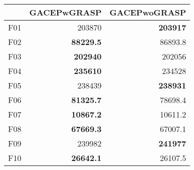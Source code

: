 \begin{table}[]
\begin{tabular}{l|r|r|}
\cline{2-3}
                                                   & \multicolumn{1}{l|}{\cellcolor[HTML]{FFFFC7}GACEPwGRASP} & \multicolumn{1}{l|}{\cellcolor[HTML]{FFFFC7}GACEPwoGRASP} \\ \hline
\multicolumn{1}{|l|}{\cellcolor[HTML]{FCE6AB}F01}  & 203870                                                   & \cellcolor[HTML]{D3FFB6}\textbf{203917}                   \\ \hline
\multicolumn{1}{|l|}{\cellcolor[HTML]{FCE6AB}F02}  & \cellcolor[HTML]{D3FFB6}\textbf{88229.5}                 & 86893.8                                                   \\ \hline
\multicolumn{1}{|l|}{\cellcolor[HTML]{FCE6AB}F03}  & \cellcolor[HTML]{D3FFB6}\textbf{202940}                  & 202056                                                    \\ \hline
\multicolumn{1}{|l|}{\cellcolor[HTML]{FCE6AB}F04}  & \cellcolor[HTML]{D3FFB6}\textbf{235610}                  & 234528                                                    \\ \hline
\multicolumn{1}{|l|}{\cellcolor[HTML]{FCE6AB}F05}  & 238439                                                   & \cellcolor[HTML]{D3FFB6}\textbf{238931}                   \\ \hline
\multicolumn{1}{|l|}{\cellcolor[HTML]{FCE6AB}F06}  & \cellcolor[HTML]{D3FFB6}\textbf{81325.7}                 & 78698.4                                                   \\ \hline
\multicolumn{1}{|l|}{\cellcolor[HTML]{FCE6AB}F07}  & \cellcolor[HTML]{D3FFB6}\textbf{10867.2}                 & 10611.2                                                   \\ \hline
\multicolumn{1}{|l|}{\cellcolor[HTML]{FCE6AB}F08}  & \cellcolor[HTML]{D3FFB6}\textbf{67669.3}                 & 67007.1                                                   \\ \hline
\multicolumn{1}{|l|}{\cellcolor[HTML]{FCE6AB}F09}  & 239982                                                   & \cellcolor[HTML]{D3FFB6}\textbf{241977}                   \\ \hline
\multicolumn{1}{|l|}{\cellcolor[HTML]{FCE6AB}F10}  & \cellcolor[HTML]{D3FFB6}\textbf{26642.1}                 & 26107.5                                                   \\ \hline

\end{tabular}
\end{table}
